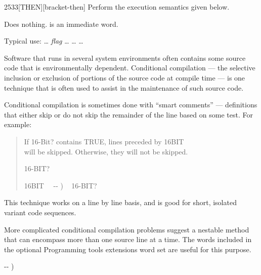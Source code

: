 \pagebreak
\begin{worddef}{2533}{[THEN]}[bracket-then]
\compile
	Perform the execution semantics given below.

\execute
	\stack{}{}

	Does nothing. \word{[THEN]} is an immediate word.


	\begin{rationale} %
		Typical use:
			{\ldots} \emph{flag}
			\word[tools]{[IF]} {\ldots}
			\word[tools]{[ELSE]} {\ldots}
			\word[tools]{[THEN]} {\ldots}

		Software that runs in several system environments often
		contains some source code that is environmentally dependent.
		Conditional compilation --- the selective inclusion or
		exclusion of portions of the source code at compile time ---
		is one technique that is often used to assist in the
		maintenance of such source code.

		Conditional compilation is sometimes done with ``smart
		comments'' --- definitions that either skip or do not skip
		the remainder of the line based on some test. For example:

		\begin{quote}\ttfamily
			 If 16-Bit? contains TRUE, lines preceded by 16BIT\bs \\
			 will be skipped. Otherwise, they will not be skipped.

			 16-BIT?

			\word{:} 16BIT\bs~~ -{}- ) ~
				16-BIT?  ~
				 ~   ~  \\
			\word{;} 
		\end{quote}

		This technique works on a line by line basis, and is good for
		short, isolated variant code sequences.

		More complicated conditional compilation problems suggest a
		nestable method that can encompass more than one source line
		at a time. The words included in the optional Programming tools
		extensions word set are useful for this purpose.
	\end{rationale}

	\begin{implement} %
		\word{:} \word{[THEN]}  -{}- ) \word{;} 
	\end{implement}


\end{worddef}
